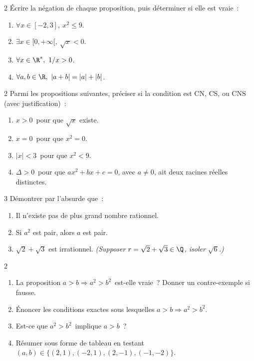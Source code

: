 \begin{exo}{2}
\'Ecrire la n\'egation de chaque proposition, puis d\'eterminer si elle est vraie~:
\begin{enumerate}
  \item $\forall x\in[-2,3],\ x^2\leq9$.
  \item $\exists x\in[0,+\infty[,\ \sqrt{x}<0$.
  \item $\forall x\in\R^*,\ 1/x>0$.
  \item $\forall a,b\in\R,\ |a+b|=|a|+|b|$.
\end{enumerate}
\end{exo}

\begin{exo}{2}
Parmi les propositions suivantes, pr\'eciser si la condition est
CN, CS, ou CNS (avec justification)~:
\begin{enumerate}
  \item \og $x>0$\fg\ pour que \og $\sqrt{x}$ existe\fg.
  \item \og $x=0$\fg\ pour que \og $x^2=0$\fg.
  \item \og $|x|<3$\fg\ pour que \og $x^2<9$\fg.
  \item \og $\Delta>0$\fg\ pour que \og $ax^2+bx+c=0$,
        avec $a\ne0$, ait deux racines r\'eelles distinctes\fg.
\end{enumerate}
\end{exo}

\begin{exo}{3}
D\'emontrer par l'absurde que~:
\begin{enumerate}
  \item Il n'existe pas de plus grand nombre rationnel.
  \item Si $a^2$ est pair, alors $a$ est pair.
  \item $\sqrt{2}+\sqrt{3}$ est irrationnel.
        \emph{(Supposer $r=\sqrt{2}+\sqrt{3}\in\Q$, isoler $\sqrt{6}$.)}
\end{enumerate}
\end{exo}

\begin{exo}{2}
\begin{enumerate}
  \item La proposition \og $a>b \Rightarrow a^2>b^2$\fg\ est-elle vraie~?
        Donner un contre-exemple si fausse.
  \item \'Enoncer les conditions exactes sous lesquelles $a>b\Rightarrow a^2>b^2$.
  \item Est-ce que \og $a^2>b^2$\fg\ implique \og $a>b$\fg~?
  \item R\'esumer sous forme de tableau en testant $(a,b)\in\{(2,1),(-2,1),(2,-1),(-1,-2)\}$.
\end{enumerate}
\end{exo}

